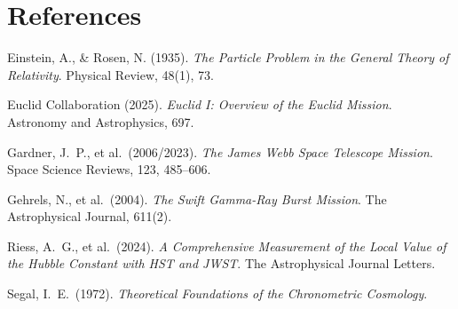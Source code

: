 \documentclass[12pt]{article}
\begin{document}
\section*{References}
\noindent Einstein, A., \& Rosen, N. (1935). \textit{The Particle Problem in the General Theory of Relativity}. Physical Review, 48(1), 73. \par\medskip
\noindent Euclid Collaboration (2025). \textit{Euclid I: Overview of the Euclid Mission}. Astronomy and Astrophysics, 697. \par\medskip
\noindent Gardner, J.\ P., et al.\ (2006/2023). \textit{The James Webb Space Telescope Mission}. Space Science Reviews, 123, 485--606. \par\medskip
\noindent Gehrels, N., et al.\ (2004). \textit{The Swift Gamma-Ray Burst Mission}. The Astrophysical Journal, 611(2). \par\medskip
\noindent Riess, A.\ G., et al.\ (2024). \textit{A Comprehensive Measurement of the Local Value of the Hubble Constant with HST and JWST}. The Astrophysical Journal Letters. \par\medskip
\noindent Segal, I.\ E.\ (1972). \textit{Theoretical Foundations of the Chronometric Cosmology}.
\end{document}
